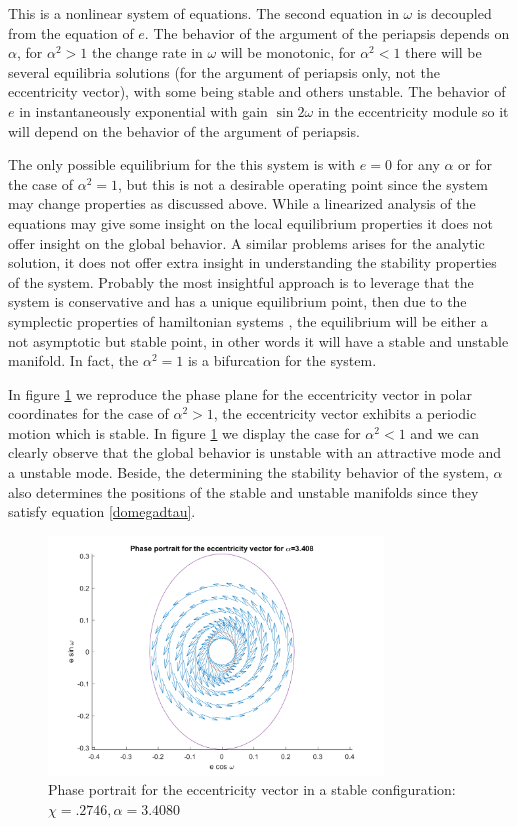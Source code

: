 This is a nonlinear system of equations. The second equation in $\omega$ is decoupled from the equation of $e$. The behavior of the argument of the periapsis depends on $\alpha$, for $\alpha^2>1$ the change rate in $\omega$ will be monotonic, for $\alpha^2<1$ there will be several equilibria solutions (for the argument of periapsis only, not the eccentricity vector), with some being stable and others unstable. The behavior of $e$ in instantaneously exponential with gain $\sin 2\omega$ in the eccentricity module so it will depend on the behavior of the argument of periapsis. 

The only possible equilibrium for the this system is with $e=0$ for any $\alpha$ or for the case of $\alpha^2=1$, but this is not a desirable operating point since the system may change properties as discussed above. While a linearized analysis of the equations may give some insight on the local equilibrium properties it does not offer insight on the global behavior. A similar problems arises for the analytic solution, it does not offer extra insight in understanding the stability properties of the system. Probably the most insightful approach is to leverage that the system is conservative and has a unique equilibrium point, then due to the symplectic properties of hamiltonian systems \cite{scheeres2012orbital55} \cite{meirovitch1970methods}, the equilibrium will be either a not asymptotic but stable point, in other words it will have a stable and unstable manifold. In fact, the $\alpha^2=1$ is a bifurcation for the system.

In figure \ref{fig:eccentricityPhasePortraitStable} we reproduce the phase plane for the eccentricity vector in polar coordinates for the case of $\alpha^2>1$, the eccentricity vector exhibits a periodic motion which is stable. In figure \ref{fig:eccentricityPhasePortraitStable} we display the case for $\alpha^2<1$ and we can clearly observe that the global behavior is unstable with an attractive mode and a unstable mode. Beside, the determining the stability behavior of the system, $\alpha$ also determines the positions of the stable and unstable manifolds since they satisfy equation \ref{domegadtau}.

\begin{figure}[h]
	\centering
	\includegraphics[height=2.5in]
	{figures/Europe400km01e30i/EccentricityPhasePortrait.png}
	\caption{Phase portrait for the eccentricity vector in a stable configuration: $\chi = .2746, \alpha = 3.4080$}
	\label{fig:eccentricityPhasePortraitStable}
\end{figure}

